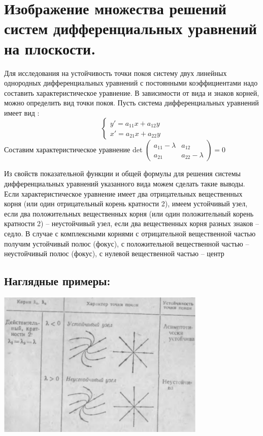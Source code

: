 \documentclass[12pt]{article}
\begin{document}
    \section{ Изображение множества решений систем дифференциальных уравнений на плоскости.}

    Для исследования на устойчивость точки покоя систему двух линейных однородных дифференциальных уравнений с постоянными коэффициентами надо составить характеристическое уравнение. В зависимости от вида и знаков корней, можно определить вид точки покоя.
    Пусть система дифференциальных уравнений имеет вид :
    \[
        \begin{cases}
            y'=a_{11}x+a_{12}y \\
            x'=a_{21}x+a_{22}y
        \end{cases}
    \]
    Составим характеристическое уравнение det
$\begin{pmatrix}
    a_{11}-\lambda & a_{12}         \\
    a_{21}         & a_{22}-\lambda
\end{pmatrix} =0$


    Из свойств показательной функции и общей формулы для решения системы дифференциальных
    уравнений указанного вида можем сделать такие выводы.
    Если характеристическое уравнение имеет два отрицательных вещественных корня (или один
    отрицательный корень кратности 2), имеем устойчивый узел, если два положительных вещественных корня
    (или один положительный корень кратности 2) – неустойчивый узел, если два вещественных корня разных
    знаков – седло.
    В случае с комплексными корнями с отрицательной вещественной частью получим устойчивый полюс
    (фокус), с положительной вещественной частью – неустойчивый полюс (фокус), с нулевой вещественной
    частью – центр

    \subsection{Наглядные примеры:}

    \includegraphics[width=100mm]{graphics/31_de_1.png}
\end{document}
